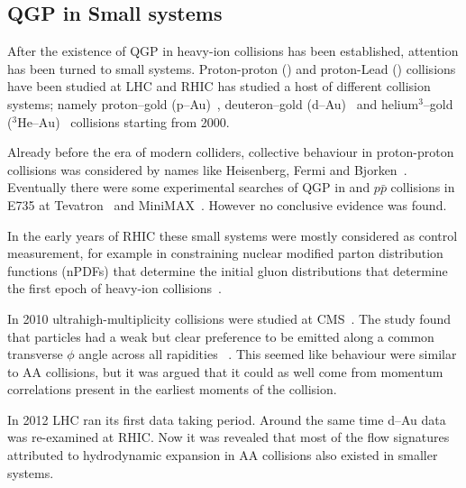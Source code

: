 
\subsection{QGP in Small systems}
\label{sec:smallsystem}
After the existence of QGP in heavy-ion collisions has been established, attention has been turned to small systems. Proton-proton (\pp) and proton-Lead (\pPb) collisions have been studied at LHC and RHIC has studied a host of different collision systems; namely proton--gold (p--Au)~\cite{Aidala:2016vgl}, deuteron--gold (d--Au)~\cite{Adler:2003ii,Arsene:2003yk,Back:2003ns,Adams:2003im} and helium$^3$--gold ($^3\mbox{He--Au}$)~\cite{Adare:2015ctn} collisions starting from 2000. %

Already before the era of modern colliders, collective behaviour in proton-proton collisions was considered by names like Heisenberg, Fermi and Bjorken~\cite{Nagle:2018nvi}. Eventually there were some experimental searches of QGP in \pp and $p\bar p$ collisions in E735 at Tevatron~\cite{Alexopoulos:1993wt} and MiniMAX~\cite{Brooks:1999xy}. However no conclusive evidence was found. 

In the early years of RHIC these small systems were mostly considered as control measurement, for example in constraining nuclear modified parton distribution functions (nPDFs) that determine the initial gluon distributions that determine the first epoch of heavy-ion collisions~\cite{Shen:2015qta, Adare:2015lcd}. 

In 2010 ultrahigh-multiplicity \pp collisions were studied at CMS~\cite{Khachatryan:2010gv}. The study found that particles had a weak but clear preference to be emitted along a common transverse $\phi$ angle across all rapidities ~\cite{Salgado:2016jws}. This seemed like behaviour were similar to AA collisions, but it was argued that it could as well come from momentum correlations present in the earliest moments of the collision.

In 2012 LHC ran its first \pPb data taking period. Around the same time d--Au data was re-examined at RHIC. Now it was revealed that most of the flow signatures attributed to hydrodynamic expansion in AA collisions also existed in smaller systems.



